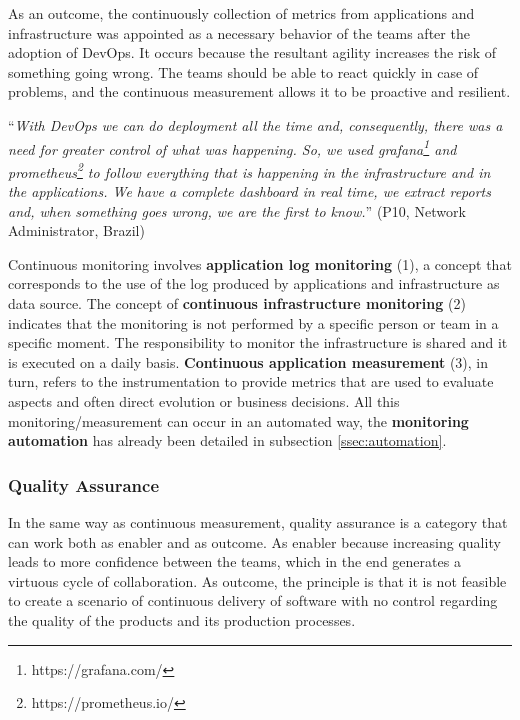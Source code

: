 As an outcome, the continuously collection of metrics from applications and
infrastructure was appointed as a necessary behavior of the teams after the adoption
of DevOps. It occurs because the resultant agility increases the risk of
something going wrong. The teams should be able to react quickly in case of
problems, and the continuous measurement allows it to be proactive and resilient.

\begin{mq}
``\emph{With DevOps we can do deployment all the time and, consequently, there was
a need for greater control of what was happening. So, we used
grafana\footnote{https://grafana.com/} and
prometheus\footnote{https://prometheus.io/} to follow everything that is
happening in the infrastructure and in the applications. We have a complete
dashboard in real time, we extract reports and, when something goes wrong, we
are the first to know.}'' (P10, Network Administrator, Brazil)
\end{mq}

Continuous monitoring involves \textbf{application log monitoring} (1), a
concept that corresponds to the use of the log produced by
applications and infrastructure as data source. The concept of
\textbf{continuous infrastructure monitoring} (2) indicates that the monitoring
is not performed by a specific person or team in a specific moment. The
responsibility to monitor the infrastructure is shared and it is executed on
a daily basis. \textbf{Continuous application measurement} (3), in turn, refers to
the instrumentation to provide metrics that are used to evaluate aspects and
often direct evolution or business decisions. All this monitoring/measurement
can occur in an automated way, the \textbf{monitoring automation} has already been
detailed in subsection \ref{ssec:automation}.

\subsubsection{Quality Assurance}

In the same way as continuous measurement, quality assurance is a category that
can work both as enabler and as outcome. As enabler because increasing quality
leads to more confidence between the teams, which in the end generates a virtuous
cycle of collaboration. As outcome, the principle is that it is not
feasible to create a scenario of continuous delivery of software with no control
regarding the quality of the products and its production processes.

